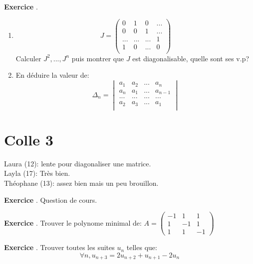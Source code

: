 \documentclass[10pt,a4paper]{article}
\newcounter{question}
\newcounter{exo}
\newenvironment{exo}{\vspace{0.5cm}\setcounter{question}{0}\addtocounter{exo}{1} \noindent \textbf{Exercice \theexo}. \normalsize }{\par}
\begin{document}
	\begin{exo}
		\begin{enumerate}
			\item $$J = \begin{pmatrix}
			0 & 1 & 0  & ... \\ 
			0 & 0 & 1 & ...\\ 
			... & ... & ...  & 1\\
			1 & 0 & ...  & 0\\
			\end{pmatrix}$$ Calculer $J^2, ..., J^n$ puis montrer que $J$ est diagonalisable, quelle sont ses v.p?
			\item En déduire la valeur de:
			$$\Delta_n = \begin{vmatrix}
			a_1 & a_2 & ... & a_n \\ 
			a_n & a_1 & ... & a_{n-1} \\ 
			... & ... & ... & ...\\
			a_2 & a_3 & ... & a_1\\
			\end{vmatrix}$$
		\end{enumerate}
	\end{exo}

	\section*{Colle 3}
	\setcounter{exo}{0}
	Laura (12): lente pour diagonaliser une matrice.\\
	Layla (17): Très bien.\\
	Théophane (13): assez bien mais un peu brouillon.\\
	
	\begin{exo}
		Question de cours.
	\end{exo}

	\begin{exo}
		Trouver le polynome minimal de:
		$A = \begin{pmatrix}
		-1 & 1 & 1 \\ 
		1 & -1 & 1 \\ 
		1 & 1 & -1
		\end{pmatrix}$
	\end{exo}
		
	\begin{exo}
		Trouver toutes les suites $u_n$ telles que:
		$$\forall n, u_{n+3} = 2 u_{n+2} + u_{n+1} - 2u_n$$
	\end{exo}
	 
\end{document}
